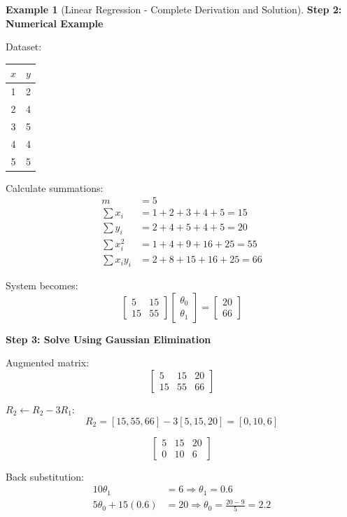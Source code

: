 \documentclass[12pt,a4paper]{article}
\theoremstyle{definition}
\newtheorem{example}{Example}[section]
\begin{document}
\begin{example}[Linear Regression - Complete Derivation and Solution]
\textbf{Step 2: Numerical Example}

Dataset:
\begin{center}
\begin{tabular}{|c|c|}
\hline
$x$ & $y$ \\
\hline
1 & 2 \\
2 & 4 \\
3 & 5 \\
4 & 4 \\
5 & 5 \\
\hline
\end{tabular}
\end{center}

Calculate summations:
\begin{align*}
m &= 5 \\
\sum x_i &= 1 + 2 + 3 + 4 + 5 = 15 \\
\sum y_i &= 2 + 4 + 5 + 4 + 5 = 20 \\
\sum x_i^2 &= 1 + 4 + 9 + 16 + 25 = 55 \\
\sum x_i y_i &= 2 + 8 + 15 + 16 + 25 = 66
\end{align*}

System becomes:
\[
\begin{bmatrix}
5 & 15 \\
15 & 55
\end{bmatrix}
\begin{bmatrix}
\theta_0 \\ \theta_1
\end{bmatrix}
= \begin{bmatrix}
20 \\ 66
\end{bmatrix}
\]

\textbf{Step 3: Solve Using Gaussian Elimination}

Augmented matrix:
\[
\left[\begin{array}{cc|c}
5 & 15 & 20 \\
15 & 55 & 66
\end{array}\right]
\]

$R_2 \leftarrow R_2 - 3R_1$:
\[
R_2 = [15, 55, 66] - 3[5, 15, 20] = [0, 10, 6]
\]

\[
\left[\begin{array}{cc|c}
5 & 15 & 20 \\
0 & 10 & 6
\end{array}\right]
\]

Back substitution:
\begin{align*}
10\theta_1 &= 6 \Rightarrow \theta_1 = 0.6 \\
5\theta_0 + 15(0.6) &= 20 \Rightarrow \theta_0 = \frac{20 - 9}{5} = 2.2
\end{align*}


\end{example}
\end{document}
